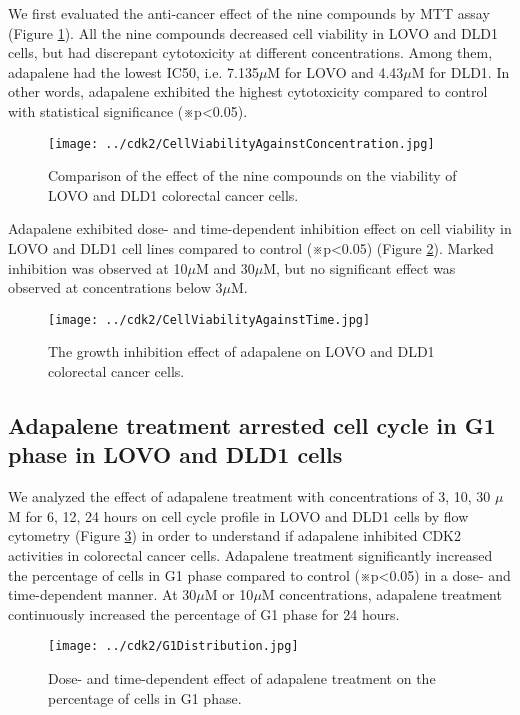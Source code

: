 We first evaluated the anti-cancer effect of the nine compounds by MTT assay (Figure \ref{cdk2:CellViabilityAgainstConcentration}). All the nine compounds decreased cell viability in LOVO and DLD1 cells, but had discrepant cytotoxicity at different concentrations. Among them, adapalene had the lowest IC50, i.e. 7.135$\mu$M for LOVO and 4.43$\mu$M for DLD1. In other words, adapalene exhibited the highest cytotoxicity compared to control with statistical significance (※p<0.05).

\begin{figure}
\centering
\texttt{[image: ../cdk2/CellViabilityAgainstConcentration.jpg]}
\caption{Comparison of the effect of the nine compounds on the viability of LOVO and DLD1 colorectal cancer cells.}
\label{cdk2:CellViabilityAgainstConcentration}
\end{figure}

Adapalene exhibited dose- and time-dependent inhibition effect on cell viability in LOVO and DLD1 cell lines compared to control (※p<0.05) (Figure \ref{cdk2:CellViabilityAgainstTime}). Marked inhibition was observed at 10$\mu$M and 30$\mu$M, but no significant effect was observed at concentrations below 3$\mu$M.

\begin{figure}
\centering
\texttt{[image: ../cdk2/CellViabilityAgainstTime.jpg]}
\caption{The growth inhibition effect of adapalene on LOVO and DLD1 colorectal cancer cells.}
\label{cdk2:CellViabilityAgainstTime}
\end{figure}

\subsection{Adapalene treatment arrested cell cycle in G1 phase in LOVO and DLD1 cells}

We analyzed the effect of adapalene treatment with concentrations of 3, 10, 30 $\mu$M for 6, 12, 24 hours on cell cycle profile in LOVO and DLD1 cells by flow cytometry (Figure \ref{cdk2:G1Distribution}) in order to understand if adapalene inhibited CDK2 activities in colorectal cancer cells. Adapalene treatment significantly increased the percentage of cells in G1 phase compared to control (※p<0.05) in a dose- and time-dependent manner. At 30$\mu$M or 10$\mu$M concentrations, adapalene treatment continuously increased the percentage of G1 phase for 24 hours.

\begin{figure}
\centering
\texttt{[image: ../cdk2/G1Distribution.jpg]}
\caption{Dose- and time-dependent effect of adapalene treatment on the percentage of cells in G1 phase.}
\label{cdk2:G1Distribution}
\end{figure}

